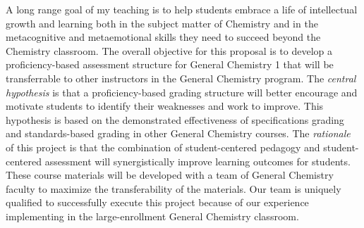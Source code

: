 \documentclass[10pt,letterpaper]{article}
\begin{document}
A long range goal of my teaching is to help students embrace a life of intellectual growth and learning both in the subject matter of Chemistry and in the metacognitive and metaemotional skills they need to succeed beyond the Chemistry classroom.
%
The overall objective for this proposal is to develop a proficiency-based assessment structure for General Chemistry 1 that will be transferrable to other instructors in the General Chemistry program. 
The \textit{central hypothesis} is that a proficiency-based grading structure will better encourage and motivate students to identify their weaknesses and work to improve. 
%
This hypothesis is based on the demonstrated effectiveness of specifications grading and standards-based grading in other General Chemistry courses.\cite{Boesdorfer2018,Martin2019}
The \textit{rationale} of this project is that the combination of student-centered pedagogy  and student-centered assessment will synergistically improve learning outcomes for students.  These course materials will be developed with a team of General Chemistry faculty to maximize the transferability of the materials. 
Our team is uniquely qualified to successfully execute this project because of our experience implementing \pogil in the large-enrollment General Chemistry classroom.
\end{document}
